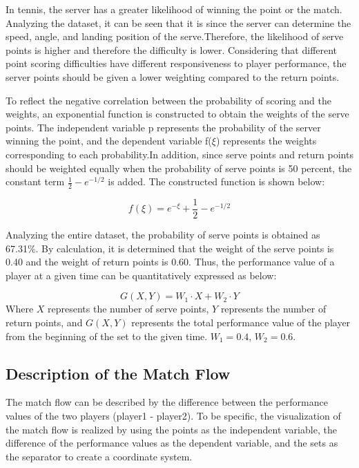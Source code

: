 \documentclass[12pt]{article}  %
\begin{document}
In tennis, the server has a greater likelihood of winning the point or the match. Analyzing the dataset, it can be seen that it is since the server can determine the speed, angle, and landing position of the serve.Therefore, the likelihood of serve points is higher and therefore the difficulty is lower. Considering that different point scoring difficulties have different responsiveness to player performance, the server points should be given a lower weighting compared to the return points.

To reflect the negative correlation between the probability of scoring and the weights, an exponential function is constructed to obtain the weights of the serve points. The independent variable p represents the probability of the server winning the point, and the dependent variable f($\xi$) represents the weights corresponding to each probability.In addition, since serve points and return points should be weighted equally when the probability of serve points is 50 percent, the constant term $\frac{1}{2}-e^{-{1/2}}$ is added. The constructed function is shown below:

\begin{equation}
	f(\xi)=e^{-\xi}+\frac{1}{2}-e^{-{1/2}}
\end{equation}

Analyzing the entire dataset, the probability of serve points is obtained as 67.31\%. By calculation, it is determined that the weight of the serve points is 0.40 and the weight of return points is 0.60. Thus, the performance value of a player at a given time can be quantitatively expressed as below:

\begin{equation}
	G(X, Y)=W_1 \cdot X+W_2 \cdot Y
\end{equation}
Where $X$ represents the number of serve points, $Y$ represents the number of return points, and $G(X, Y)$ represents the total performance value of the player from the beginning of the set to the given time. $W_1=0.4$, $W_2=0.6$.

\subsection{Description of the Match Flow}
The match flow can be described by the difference between the performance values of the two players (player1 - player2). To be specific, the visualization of the match flow is realized by using the points as the independent variable, the difference of the performance values as the dependent variable, and the sets as the separator to create a coordinate system.
\end{document}
